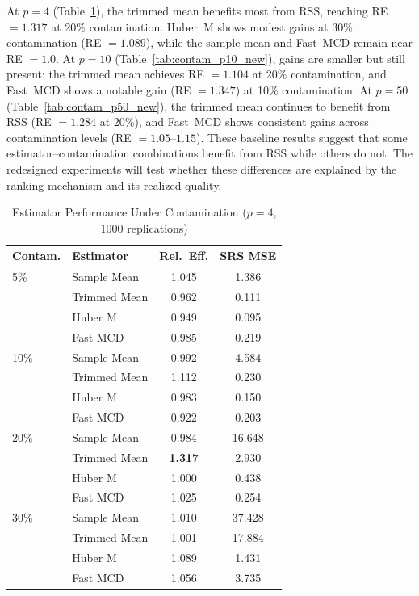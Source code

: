 \documentclass[12pt]{article}
\begin{document}
At $p = 4$ (Table~\ref{tab:contam_p4_new}), the trimmed mean benefits most from RSS, reaching RE $= 1.317$ at 20\% contamination. Huber~M shows modest gains at 30\% contamination (RE $= 1.089$), while the sample mean and Fast~MCD remain near RE $= 1.0$. At $p = 10$ (Table~\ref{tab:contam_p10_new}), gains are smaller but still present: the trimmed mean achieves RE $= 1.104$ at 20\% contamination, and Fast~MCD shows a notable gain (RE $= 1.347$) at 10\% contamination. At $p = 50$ (Table~\ref{tab:contam_p50_new}), the trimmed mean continues to benefit from RSS (RE $= 1.284$ at 20\%), and Fast~MCD shows consistent gains across contamination levels (RE $= 1.05$--$1.15$). These baseline results suggest that some estimator--contamination combinations benefit from RSS while others do not. The redesigned experiments will test whether these differences are explained by the ranking mechanism and its realized quality.

\begin{table}[htbp]
\centering
\caption{Estimator Performance Under Contamination ($p = 4$, 1000 replications)}
\label{tab:contam_p4_new}
\begin{tabular}{llcc}
\toprule
Contam. & Estimator & Rel.\ Eff. & SRS MSE \\
\midrule
5\% & Sample Mean & 1.045 & 1.386 \\
& Trimmed Mean & 0.962 & 0.111 \\
& Huber M & 0.949 & 0.095 \\
& Fast MCD & 0.985 & 0.219 \\
\midrule
10\% & Sample Mean & 0.992 & 4.584 \\
& Trimmed Mean & 1.112 & 0.230 \\
& Huber M & 0.983 & 0.150 \\
& Fast MCD & 0.922 & 0.203 \\
\midrule
20\% & Sample Mean & 0.984 & 16.648 \\
& Trimmed Mean & \textbf{1.317} & 2.930 \\
& Huber M & 1.000 & 0.438 \\
& Fast MCD & 1.025 & 0.254 \\
\midrule
30\% & Sample Mean & 1.010 & 37.428 \\
& Trimmed Mean & 1.001 & 17.884 \\
& Huber M & 1.089 & 1.431 \\
& Fast MCD & 1.056 & 3.735 \\
\bottomrule
\end{tabular}
\end{table}
\end{document}
